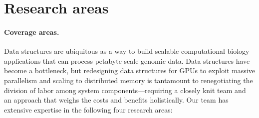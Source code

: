
\section{Research areas}





\paragraph{Coverage areas.}
Data structures are ubiquitous  as a way to build scalable computational biology applications that can process petabyte-scale genomic data.
Data structures have become a bottleneck, but redesigning data structures for GPUs to exploit massive parallelism and scaling to distributed memory is tantamount to renegotiating the division of labor among system components---requiring a closely knit team and an approach that weighs the costs and benefits holistically.
Our team has extensive expertise in the following four research areas:


